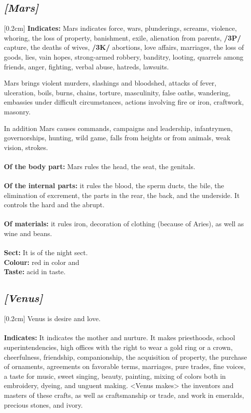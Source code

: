 \secbr
\subsection{\textit{[Mars]}}
[0.2cm]
\noindent
\textbf{Indicates:} Mars indicates force, wars, plunderings, screams, violence, whoring, the loss of property, banishment,
exile, alienation from parents, \textbf{/3P/} capture, the deaths of wives, \textbf{/3K/} abortions, love affairs, marriages, the loss of goods, lies, vain hopes, strong-armed robbery, banditry, looting, quarrels among friends, anger,
fighting, verbal abuse, hatreds, lawsuits. 

Mars brings violent murders, slashings and bloodshed, attacks of fever, ulceration, boils, burns, chains, torture, masculinity, false oaths, wandering, embassies under difficult
circumstances, actions involving fire or iron, craftwork, masonry. 

In addition Mars causes commands, campaigns and leadership, infantrymen, governorships, hunting, wild game, falls from heights or from animals, weak vision, strokes. \\
\\
\textbf{Of the body part:} Mars rules the head, the seat, the genitals. \\
\\
\textbf{Of the internal parts:} it rules the blood, the sperm ducts, the bile, the elimination of excrement, the parts in the rear, the back, and the underside. It controls the hard and the abrupt. \\
\\
\textbf{Of materials:} it rules iron, decoration of clothing (because of Aries), as well as wine and beans. \\
\\
\textbf{Sect:} It is of the night sect. \\
\textbf{Colour:} red in color and \\
\textbf{Taste:} acid in taste.

\secbr
\subsection{\textit{[Venus]}}
[0.2cm]
Venus is desire and love. \\
\\
\textbf{Indicates:} It indicates the mother and nurture. It makes priesthoods, school superintendencies, high offices with the right to wear a gold ring or a crown, cheerfulness, friendship, companionship, the acquisition of property, the purchase of ornaments, agreements on favorable terms, marriages, pure trades, fine voices, a taste for music, sweet singing, beauty, painting, mixing of colors both in embroidery, dyeing, and unguent making. <Venus makes> the inventors and masters of these crafts, as well as craftsmanship or trade, and work in emeralds, precious stones, and ivory. 

